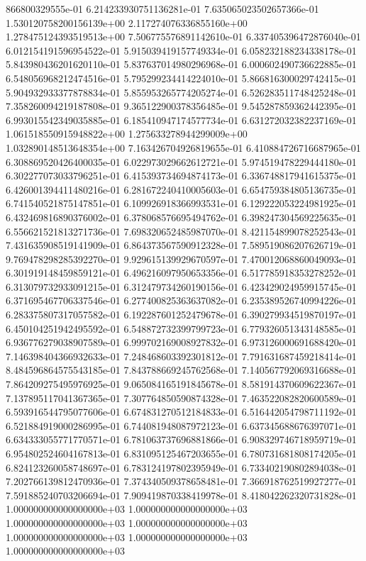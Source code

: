 866800329555e-01	6.214233930751136281e-01	7.635065023502657366e-01	1.530120758200156139e+00	2.117274076336855160e+00	1.278475124393519513e+00	7.506775576891142610e-01	6.337405396472876040e-01	6.012154191596954522e-01	5.915039419157749334e-01	6.058232188234338178e-01	5.843980436201620110e-01	5.837637014980296968e-01	6.000602490736622885e-01	6.548056968212474516e-01	5.795299234414224010e-01	5.866816300029742415e-01	5.904932933377878834e-01	5.855953265774205274e-01	6.526283511748425248e-01	7.358260094219187808e-01	9.365122900378356485e-01	9.545287859362442395e-01	6.993015542349035885e-01	6.185410947174577734e-01	6.631272032382237169e-01	1.061518550915948822e+00	1.275633278944299009e+00	1.032890148513648354e+00	7.163426704926819655e-01	6.410884726716687965e-01	6.308869520426400035e-01	6.022973029662612721e-01	5.974519478229444180e-01	6.302277073033796251e-01	6.415393734694874173e-01	6.336748817941615375e-01	6.426001394411480216e-01	6.281672240410005603e-01	6.654759384805136735e-01	6.741540521875147851e-01	6.109926918366993531e-01	6.129222053224981925e-01	6.432469816890376002e-01	6.378068576695494762e-01	6.398247304569225635e-01	6.556621521813271736e-01	7.698320652485987070e-01	8.421154899078252543e-01	7.431635908519141909e-01	6.864373567590912328e-01	7.589519086207626719e-01	9.769478298285392270e-01	9.929615139929670597e-01	7.470012068860049093e-01	6.301919148459859121e-01	6.496216097950653356e-01	6.517785918353278252e-01	6.313079732933091215e-01	6.312479734260190156e-01	6.423429024959915745e-01	6.371695467706337546e-01	6.277400825363637082e-01	6.235389526740994226e-01	6.283375807317057582e-01	6.192287601252479678e-01	6.390279934519870197e-01	6.450104251942495592e-01	6.548872732399799723e-01	6.779326051343148585e-01	6.936776279038907589e-01	6.999702169008927832e-01	6.973126000691688420e-01	7.146398404366932633e-01	7.248468603392301812e-01	7.791631687459218414e-01	8.484596864575543185e-01	7.843788669245762568e-01	7.140567792069316688e-01	7.864209275495976925e-01	9.065084165191845678e-01	8.581914370609622367e-01	7.137895117041367365e-01	7.307764850590874328e-01	7.463522082820600589e-01	6.593916544795077606e-01	6.674831270512184833e-01	6.516442054798711192e-01	6.521884919000286995e-01	6.744081948087972123e-01	6.637345688676397071e-01	6.634333055771770571e-01	6.781063737696881866e-01	6.908329746718959719e-01	6.954802524604167813e-01	6.831095125467203655e-01	6.780731681808174205e-01	6.824123260058748697e-01	6.783124197802395949e-01	6.733402190802894038e-01	7.202766139812470936e-01	7.374340509378658481e-01	7.366918762519927277e-01	7.591885240703206694e-01	7.909419870338419978e-01	8.418042262320731828e-01	1.000000000000000000e+03	1.000000000000000000e+03	1.000000000000000000e+03	1.000000000000000000e+03	1.000000000000000000e+03	1.000000000000000000e+03	1.000000000000000000e+03
